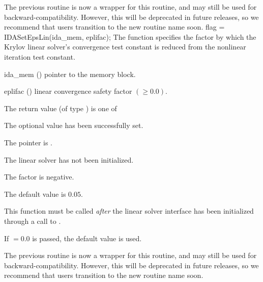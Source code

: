 {{  The previous routine  is now a wrapper
  for this routine, and may still be used for backward-compatibility.
  However, this will be deprecated in future releases, so we recommend
  that users transition to the new routine name soon.
}
{
  flag = IDASetEpsLin(ida\_mem, eplifac);
}
{
  The function  specifies the factor by
  which the Krylov linear solver's convergence test constant is
  reduced from the nonlinear iteration test constant.
}
{
  \begin{args}
  \item[ida\_mem] ()
    pointer to the {\ida} memory block.
  \item[eplifac] () linear convergence safety factor $(
    \geq 0.0)$.

  \end{args}
}
{
  The return value  (of type ) is one of
  \begin{args}
  \item[\Id{IDALS\_SUCCESS}]
    The optional value has been successfully set.
  \item[\Id{IDALS\_MEM\_NULL}]
    The  pointer is .
  \item[\Id{IDALS\_LMEM\_NULL}]
    The {\idals} linear solver has not been initialized.
  \item[\Id{IDALS\_ILL\_INPUT}]
    The factor  is negative.
  \end{args}
}
{
  The default value is $0.05$.

  This function must be called \emph{after} the {\idals} linear solver
  interface has been initialized through a call to
  .

  If $ = 0.0$ is passed, the default value is used.

  The previous routine  is now a wrapper for this
  routine, and may still be used for backward-compatibility.  However,
  this will be deprecated in future releases, so we recommend that
  users transition to the new routine name soon.
}
}
